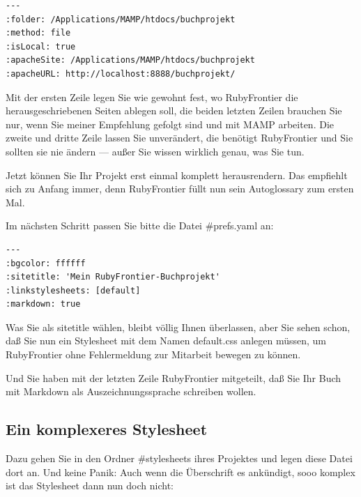 \documentclass[11pt]{report}
\begin{document}
\begin{verbatim}
--- 
:folder: /Applications/MAMP/htdocs/buchprojekt
:method: file
:isLocal: true
:apacheSite: /Applications/MAMP/htdocs/buchprojekt
:apacheURL: http://localhost:8888/buchprojekt/
\end{verbatim}

Mit der ersten Zeile legen Sie wie gewohnt fest, wo RubyFrontier die
herausgeschriebenen Seiten ablegen soll, die beiden letzten Zeilen
brauchen Sie nur, wenn Sie meiner Empfehlung gefolgt sind und mit MAMP
arbeiten. Die zweite und dritte Zeile lassen Sie unverändert, die
benötigt RubyFrontier und Sie sollten sie nie ändern — außer Sie
wissen wirklich genau, was Sie tun.


Jetzt können Sie Ihr Projekt erst einmal komplett herausrendern. Das
empfiehlt sich zu Anfang immer, denn RubyFrontier füllt nun sein
Autoglossary zum ersten Mal.


Im nächsten Schritt passen Sie bitte die Datei \#prefs.yaml an:


\begin{verbatim}
--- 
:bgcolor: ffffff
:sitetitle: 'Mein RubyFrontier-Buchprojekt'
:linkstylesheets: [default]
:markdown: true
\end{verbatim}

Was Sie als sitetitle wählen, bleibt völlig Ihnen überlassen, aber Sie
sehen schon, daß Sie nun ein Stylesheet mit dem Namen default.css
anlegen müssen, um RubyFrontier ohne Fehlermeldung zur Mitarbeit
bewegen zu können.


Und Sie haben mit der letzten Zeile RubyFrontier mitgeteilt, daß Sie
Ihr Buch mit Markdown als Auszeichnungssprache schreiben wollen.
\subsection{Ein komplexeres Stylesheet}
\label{sec-2-6-3-1}


Dazu gehen Sie in den Ordner \#stylesheets ihres Projektes und legen
diese Datei dort an. Und keine Panik: Auch wenn die Überschrift es
ankündigt, sooo komplex ist das Stylesheet dann nun doch nicht:
\end{document}
